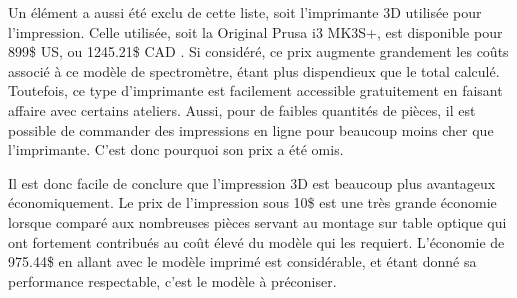 \documentclass[11pt,letterpaper]{article}
\begin{document}
Un élément a aussi été exclu de cette liste, soit l'imprimante 3D utilisée pour l'impression.
Celle utilisée, soit la Original Prusa i3 MK3S+, est disponible pour 899\$ US, ou 1245.21\$ CAD \cite{prusa_imprimante_2024} .
Si considéré, ce prix augmente grandement les coûts associé à ce modèle de spectromètre, étant
plus dispendieux que le total calculé. Toutefois, ce type d'imprimante est facilement accessible
gratuitement en faisant affaire avec certains ateliers. Aussi, pour de faibles quantités de
pièces, il est possible de commander des impressions en ligne pour beaucoup moins cher que
l'imprimante. C'est donc pourquoi son prix a été omis.

Il est donc facile de conclure que l'impression 3D est beaucoup plus avantageux économiquement.
Le prix de l'impression sous 10\$ est une très grande économie lorsque comparé aux nombreuses
pièces servant au montage sur table optique qui ont fortement contribués au coût élevé du
modèle qui les requiert. L'économie de 975.44\$ en allant avec le modèle imprimé est
considérable, et étant donné sa performance respectable, c'est le modèle à préconiser.





\end{document}
